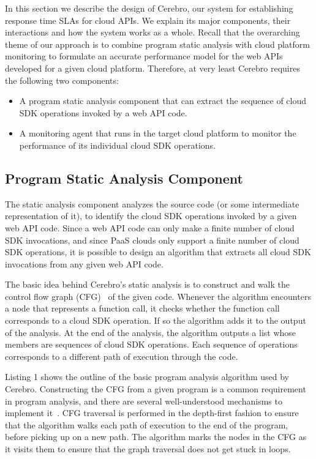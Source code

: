 In this section we describe the design of Cerebro, our system for establishing response time SLAs for
cloud APIs. We explain its major components, their interactions and how the 
system works as a whole. Recall that the overarching theme of our approach is to combine program
static analysis with cloud platform monitoring to formulate an accurate performance model for the 
web APIs developed for a given cloud platform. Therefore, at very least Cerebro requires the following 
two components:

\begin{itemize}
\item A program static analysis component that can extract the sequence of cloud SDK operations invoked by a web API
code.
\item A monitoring agent that runs in the target cloud platform to monitor the performance of its individual cloud SDK
operations.
\end{itemize}
 
 \subsection{Program Static Analysis Component}
 The static analysis component analyzes the source code (or some intermediate representation of it), to identify
 the cloud SDK operations invoked by a given web API code. Since a web API code can only make a finite
 number of cloud SDK invocations, and since PaaS clouds only support a finite number of cloud
 SDK operations, it is possible to design an algorithm that
 extracts all cloud SDK invocations from any given web API code. 

The basic idea behind Cerebro's static analysis is to construct and walk the
 control flow graph (CFG)~\cite{Allen:1970:CFA:800028.808479} of the given code. Whenever the 
 algorithm encounters a node that represents a function call,
 it checks whether the function call corresponds to a cloud SDK operation. If so the algorithm
adds it to the output of the analysis. At the end of the analysis, the algorithm outputs a list whose members are
sequences of cloud SDK operations. Each sequence of operations corresponds to a different
path of execution through the code.

Listing 1 shows the outline of the basic program analysis algorithm used by Cerebro. 
Constructing the CFG from a given program is a common requirement
in program analysis, and there are several well-understood mechanisms to implement it~\cite{Aho:1986:CPT:6448,Morgan:1998:BOC:288765,Muchnick:1998:ACD:286076}. 
CFG traversal is performed in the depth-first 
fashion to ensure that the algorithm walks each path of execution to the end of the program, before picking up on
a new path. The algorithm marks the nodes in the CFG as it visits them to ensure that the graph traversal does not 
get stuck in loops. 

